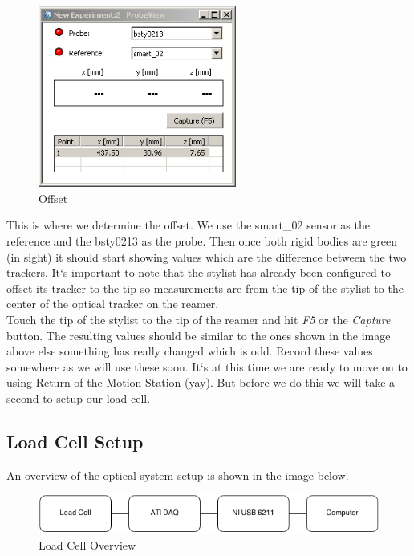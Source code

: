\documentclass[pdftex,11pt,letterpaper]{article}
\begin{document}
\begin{figure}[ht!]
\centering
\includegraphics[width=65mm]{./images/offset}
\caption{Offset}
\end{figure}

This is where we determine the offset. We use the smart\_02 sensor as the reference and the bsty0213 as the probe. Then once both rigid bodies are green (in sight) it should start showing values which are the difference between the two trackers. It`s important to note that the stylist has already been configured to offset its tracker to the tip so measurements are from the tip of the stylist to the center of the optical tracker on the reamer. \\

Touch the tip of the stylist to the tip of the reamer and hit \textit{F5} or the \textit{Capture} button. The resulting values should be similar to the ones shown in the image above else something has really changed which is odd. Record these values somewhere as we will use these soon. 
It`s at this time we are ready to move on to using Return of the Motion Station (yay). But before we do this we will take a second to setup our load cell. 

\subsection{Load Cell Setup}
An overview of the optical system setup is shown in the image below. \\

\begin{figure}[ht!]
\centering
\includegraphics[width=150mm]{./images/lc_overview}
\caption{Load Cell Overview}
\end{figure}
\end{document}
